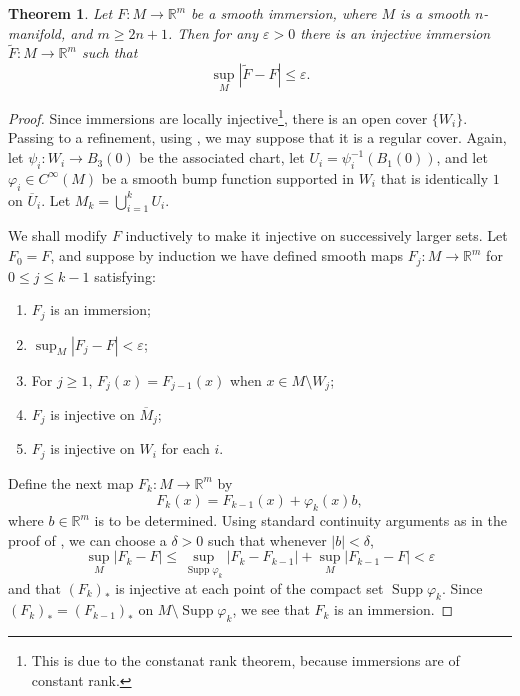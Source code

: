 \documentclass[11pt]{article}
\theoremstyle{thmstyle}
\newtheorem{theorem}{Theorem}[section]
\theoremstyle{defstyle}
\newcommand{\R}{\mathbb{R}}
\newcommand{\Supp}{\operatorname{Supp}}
\newcommand{\wt}[1]{\widetilde{#1}}
\renewcommand{\le}{\leqslant}
\renewcommand{\ge}{\geqslant}
\begin{document}
\begin{theorem}
	Let $F\colon M\to\R^m$ be a smooth immersion, where $M$ is a smooth $n$-manifold, and $m\ge 2n + 1$. Then for any $\varepsilon > 0$ there is an injective immersion $\wt F\colon M\to\R^m$ such that 
	\begin{equation*}
		\sup_M |\wt F - F|\le\varepsilon.
	\end{equation*}
\end{theorem}
\begin{proof}
	Since immersions are locally injective\footnote{This is due to the constanat rank theorem, because immersions are of constant rank.}, there is an open cover $\{W_i\}$. Passing to a refinement, using \cite[Proposition 2.24]{lee-smooth-manifolds}, we may suppose that it is a regular cover. Again, let $\psi_i\colon W_i\to B_3(0)$ be the associated chart, let $U_i = \psi_i^{-1}\left(B_1(0)\right)$, and let $\varphi_i\in C^\infty(M)$ be a smooth bump function supported in $W_i$ that is identically $1$ on $\overline U_i$. Let $M_k = \bigcup_{i = 1}^k U_i$.

	We shall modify $F$ inductively to make it injective on successively larger sets. Let $F_0 = F$, and suppose by induction we have defined smooth maps $F_j\colon M\to\R^m$ for $0\le j\le k - 1$ satisfying: 
	\begin{enumerate}[label=(\roman*)]
		\item $F_j$ is an immersion; \label{(i)}
		\item $\displaystyle\sup_M |F_j - F| < \varepsilon$;\label{(ii)}
		\item For $j\ge 1$, $F_j(x) = F_{j - 1}(x)$ when $x\in M\setminus  W_j$; \label{(iii)}
		\item $F_j$ is injective on $\overline M_j$; \label{(iv)}
		\item $F_j$ is injective on $W_i$ for each $i$.\label{(v)}
	\end{enumerate}
	Define the next map $F_k\colon M\to\R^m$ by 
	\begin{equation*}
		F_k(x) = F_{k - 1}(x) + \varphi_k(x)b,
	\end{equation*}
	where $b\in\R^m$ is to be determined. Using standard continuity arguments as in the proof of , we can choose a $\delta > 0$ such that whenever $|b| < \delta$, 
	\begin{equation*}
		\sup_{M} |F_k - F|\le\sup_{\Supp\varphi_k} |F_k - F_{k - 1}| + \sup_{M} |F_{k - 1} - F| < \varepsilon
	\end{equation*}
	and that $(F_k)_\ast$ is injective at each point of the compact set $\Supp\varphi_k$. Since $(F_k)_\ast = (F_{k - 1})_\ast$ on $M\setminus\Supp\varphi_k$, we see that $F_k$ is an immersion.


\end{proof}
\end{document}
